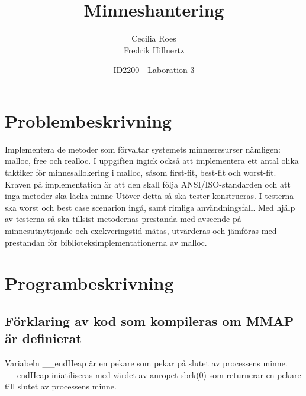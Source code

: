 \documentclass[a4paper]{article}
\title{Minneshantering}
\date{ID2200 - Laboration 3}
\author{Cecilia Roes \\ Fredrik Hillnertz}
\begin{document}

\maketitle

\section*{Problembeskrivning}
Implementera de metoder som förvaltar systemets minnesresurser nämligen: malloc, free och realloc. I uppgiften ingick också att implementera ett antal olika taktiker för minnesallokering i malloc, såsom first-fit, best-fit och worst-fit. Kraven på implementation är att den skall följa ANSI/ISO-standarden och att inga metoder ska läcka minne
Utöver detta så ska tester konstrueras. I testerna ska worst och best case scenarion ingå, samt rimliga användningsfall. Med hjälp av testerna så ska tillsist metodernas prestanda med avseende på minnesutnyttjande och exekveringstid mätas, utvärderas och jämföras med prestandan för biblioteksimplementationerna av malloc.

\section*{Programbeskrivning}

\subsection*{Förklaring av kod som kompileras om MMAP är definierat}


Variabeln __endHeap är en pekare som pekar på slutet av processens minne. __endHeap iniatiliseras med värdet av anropet sbrk(0) som returnerar en pekare till slutet av processens minne.

%

\end{document}
